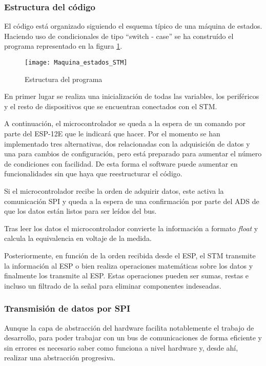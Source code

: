 \subsubsection{Estructura del código\label{sec:Software_micro_estados}}

El código está organizado siguiendo el esquema típico de una máquina de estados. Haciendo uso de condicionales de tipo ``switch - case'' se ha construído el programa representado en la figura \ref{fig:Maquina_estados_STM}. 

\begin{figure} [h]
    \centering
    \texttt{[image: Maquina\_estados\_STM]}
    \caption{Estructura del programa}
    \label{fig:Maquina_estados_STM}
\end{figure}

En primer lugar se realiza una inicialización de todas las variables, los periféricos y el resto de dispositivos que se encuentran conectados con el STM.

A continuación, el microcontrolador se queda a la espera de un comando por parte del ESP-12E que le indicará que hacer. Por el momento se han implementado tres alternativas, dos relacionadas con la adquisición de datos y una para cambios de   configuración, pero está preparado para aumentar el número de condiciones con facilidad. De esta forma el software puede aumentar en funcionalidades sin que haya que reestructurar el código.

Si el microcontrolador recibe la orden de adquirir datos, este activa la comunicación SPI y queda a la espera de una confirmación por parte del ADS de que los datos están listos para ser leídos del bus.

Tras leer los datos el microcontrolador convierte la información a formato \textit{float} y calcula la equivalencia en voltaje de la medida. 

Posteriormente, en función de la orden recibida desde el ESP, el STM transmite la información al ESP o bien realiza operaciones matemáticas sobre los datos y finalmente los transmite al ESP. Estas operaciones pueden ser sumas, restas e incluso un filtrado de la señal para eliminar componentes indeseadas.

\subsubsection{Transmisión de datos por SPI \label{sec:Software_micro_SPI}}

Aunque la capa de abstracción del hardware facilita notablemente el trabajo de desarrollo, para poder trabajar con un bus de comunicaciones de forma eficiente y sin errores es necesario saber como funciona a nivel hardware y, desde ahí, realizar una abstracción progresiva. 

